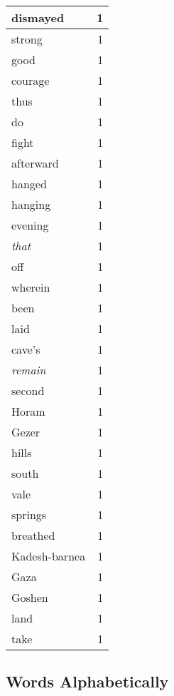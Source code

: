 \begin{center}
\begin{longtable}{l|r}
dismayed & 1 \\ \hline
strong & 1 \\ \hline
good & 1 \\ \hline
courage & 1 \\ \hline
thus & 1 \\ \hline
do & 1 \\ \hline
fight & 1 \\ \hline
afterward & 1 \\ \hline
hanged & 1 \\ \hline
hanging & 1 \\ \hline
evening & 1 \\ \hline
\emph{that} & 1 \\ \hline
off & 1 \\ \hline
wherein & 1 \\ \hline
been & 1 \\ \hline
laid & 1 \\ \hline
cave's & 1 \\ \hline
\emph{remain} & 1 \\ \hline
second & 1 \\ \hline
Horam & 1 \\ \hline
Gezer & 1 \\ \hline
hills & 1 \\ \hline
south & 1 \\ \hline
vale & 1 \\ \hline
springs & 1 \\ \hline
breathed & 1 \\ \hline
Kadesh-barnea & 1 \\ \hline
Gaza & 1 \\ \hline
Goshen & 1 \\ \hline
land & 1 \\ \hline
take & 1 \\ \hline
\end{longtable}
\end{center}



\normalsize



\subsection{Words Alphabetically}

